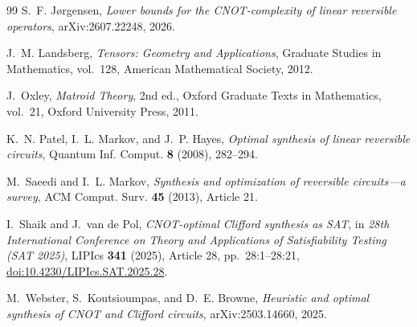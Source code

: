 \documentclass[11pt]{amsart}
\numberwithin{equation}{section}
\theoremstyle{definition}
\theoremstyle{remark}
\begin{document}
\begin{thebibliography}{99}
S.~F. J\o rgensen,
\emph{Lower bounds for the CNOT-complexity of linear reversible operators},
arXiv:2607.22248, 2026.

J.~M. Landsberg,
\emph{Tensors: Geometry and Applications},
Graduate Studies in Mathematics, vol.~128, American Mathematical Society, 2012.

J.~Oxley,
\emph{Matroid Theory}, 2nd ed.,
Oxford Graduate Texts in Mathematics, vol.~21, Oxford University Press, 2011.

K.~N. Patel, I.~L. Markov, and J.~P. Hayes,
\emph{Optimal synthesis of linear reversible circuits},
Quantum Inf. Comput. \textbf{8} (2008), 282--294.

M.~Saeedi and I.~L. Markov,
\emph{Synthesis and optimization of reversible circuits---a survey},
ACM Comput. Surv. \textbf{45} (2013), Article 21.

I.~Shaik and J.~van de Pol,
\emph{CNOT-optimal Clifford synthesis as SAT},
in \emph{28th International Conference on Theory and Applications of Satisfiability Testing (SAT 2025)},
LIPIcs \textbf{341} (2025), Article 28, pp.~28:1--28:21,
\href{https://doi.org/10.4230/LIPIcs.SAT.2025.28}{doi:10.4230/LIPIcs.SAT.2025.28}.

M.~Webster, S.~Koutsioumpas, and D.~E. Browne,
\emph{Heuristic and optimal synthesis of CNOT and Clifford circuits},
arXiv:2503.14660, 2025.

\end{thebibliography}
\end{document}
